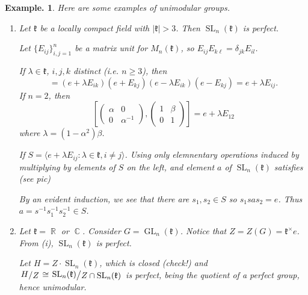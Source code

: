 \documentclass[11pt, a4paper]{memoir}
\DeclareMathOperator{\R}{{\mathbb{R}}}
\DeclareMathOperator{\C}{{\mathbb{C}}}
\theoremstyle{change}
\theoremstyle{plain}
\theoremstyle{nonumberplain}
\newtheorem{example}{Example.}
\DeclareMathOperator{\GL}{GL}
\DeclareMathOperator{\SL}{SL}
\newcommand{\quot}[2]{\mathchoice{\left.\raisebox{0.14em}{$#1$}\middle/\raisebox{-0.14em}{$#2$}\right.}
                                 {\left.\raisebox{0.08em}{$#1$}\middle/\raisebox{-0.08em}{$#2$}\right.}
                                 {\left.\raisebox{0.03em}{$#1$}\middle/\raisebox{-0.03em}{$#2$}\right.}
                                 {\left.\raisebox{0em}{$#1$}\middle/\raisebox{0em}{$#2$}\right.}}
\numberwithin{equation}{section}
\begin{document}
\begin{example}
    Here are some examples of unimodular groups.
    \begin{enumerate}[r]
        \item Let $\mathfrak{k}$ be a locally compact field with $|\mathfrak{k}|>3$.
            Then $\SL_n(\mathfrak{k})$ is perfect.

            Let $\{E_{ij}\}_{i,j=1}^n$ be a matrix unit for $M_n(\mathfrak{k})$, so $E_{ij}E_{k\ell}=\delta_{jk}E_{il}$.

            If $\lambda\in\mathfrak{k}$, $i,j,k$ distinct (i.e. $n\geq 3$), then
            \begin{equation*}
                [e+\lambda E_{ik},e+E_{kj}]=(e+\lambda E_{ik})(e+E_{kj})(e-\lambda E_{ik})(e-E_{kj})=e+\lambda E_{ij}.
            \end{equation*}
            If $n=2$, then
            \begin{equation*}
                \left[\begin{pmatrix}\alpha&0\\0&\alpha^{-1}\end{pmatrix},\begin{pmatrix}1&\beta\\0&1\end{pmatrix}\right]=e+\lambda E_{12}
            \end{equation*}
            where $\lambda=(1-\alpha^2)\beta$.

            If $S=\langle e+\lambda E_{ij}:\lambda\in\mathfrak{k},i\neq j\rangle$.
            Using only elemnentary operations induced by multiplying by elements of $S$ on the left, and element $a$ of $\SL_n(\mathfrak{k})$ satisfies
            (see pic)

            By an evident induction, we see that there are $s_1,s_2\in S$ so $s_1sas_2=e$.
            Thus $a=s^{-1}s_1^{-1}s_2^{-1}\in S$.
        \item Let $\mathfrak{k}=\R$ or $\C$.
            Consider $G=\GL_n(\mathfrak{k})$.
            Notice that $Z=Z(G)=\mathfrak{k}^\times e$.
            From (i), $\SL_n(\mathfrak{k})$ is perfect.

            Let $H=Z\cdot\SL_n(\mathfrak{k})$, which is closed (check!) and $\quot{H}{Z}\cong\quot{\SL_n(\mathfrak{k})}{Z\cap\SL_n(\mathfrak{k})}$ is perfect, being the quotient of a perfect group, hence unimodular.
            

\end{enumerate}
\end{example}
\end{document}
